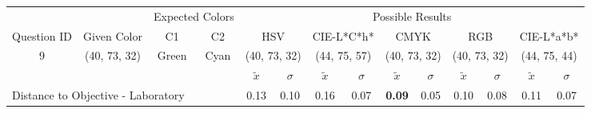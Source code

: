 \begin{table}[H]
  \resizebox{\textwidth}{!} {
  \begin{tabular}{lccccccccccccc}
    \hline
    \multicolumn{1}{c}{}                              &                                      & \multicolumn{2}{c}{Expected Colors}                   & \multicolumn{10}{c}{Possible Results}                                                                                                                                                                                                                                                                                        \\ \cline{3-14}
    \multicolumn{1}{c}{\multirow{-2}{*}{Question ID}} & \multirow{-2}{*}{Given Color}        & C1                       & C2                         & \multicolumn{2}{c}{HSV}                                        & \multicolumn{2}{c}{CIE-L*C*h*}                                 & \multicolumn{2}{c}{CMYK}                                       & \multicolumn{2}{c}{RGB}                                        & \multicolumn{2}{c}{CIE-L*a*b*}                                 \\ \hline
    \multicolumn{1}{c}{9}                             & \cellcolor[HTML]{00FF80}(40, 73, 32) & \multicolumn{1}{c|}{Green} & \multicolumn{1}{c|}{Cyan}  & \multicolumn{2}{c|}{\cellcolor[HTML]{00FF80}(40, 73, 32)}      & \multicolumn{2}{c|}{\cellcolor[HTML]{00FFB7}(44, 75, 57)}       & \multicolumn{2}{c|}{\cellcolor[HTML]{00FF80}(40, 73, 32)}       & \multicolumn{2}{c|}{\cellcolor[HTML]{00FF80}(40, 73, 32)}       & \multicolumn{2}{c|}{\cellcolor[HTML]{46FF9C}(44, 75, 44)}       \\ \hline
                                                      & \multicolumn{1}{l}{}                 & \multicolumn{1}{l}{}     & \multicolumn{1}{l}{}       & \multicolumn{1}{c}{$\tilde{x}$} & \multicolumn{1}{c}{$\sigma$} & \multicolumn{1}{c}{$\tilde{x}$} & \multicolumn{1}{c}{$\sigma$} & \multicolumn{1}{c}{$\tilde{x}$} & \multicolumn{1}{c}{$\sigma$} & \multicolumn{1}{c}{$\tilde{x}$} & \multicolumn{1}{c}{$\sigma$} & \multicolumn{1}{c}{$\tilde{x}$} & \multicolumn{1}{c}{$\sigma$} \\ \hline
    \multicolumn{4}{l}{Distance to Objective - Laboratory}                                                                                           & \multicolumn{1}{|c}{0.13}       & \multicolumn{1}{c|}{0.10}    & \multicolumn{1}{|c}{0.16}       & \multicolumn{1}{c|}{0.07}    & \multicolumn{1}{|c}{\textbf{0.09}}       & \multicolumn{1}{c|}{0.05}    & \multicolumn{1}{|c}{0.10}       & \multicolumn{1}{c|}{0.08}    & \multicolumn{1}{|c}{0.11}       & \multicolumn{1}{c|}{0.07}    \\

\end{tabular}}
\end{table}
